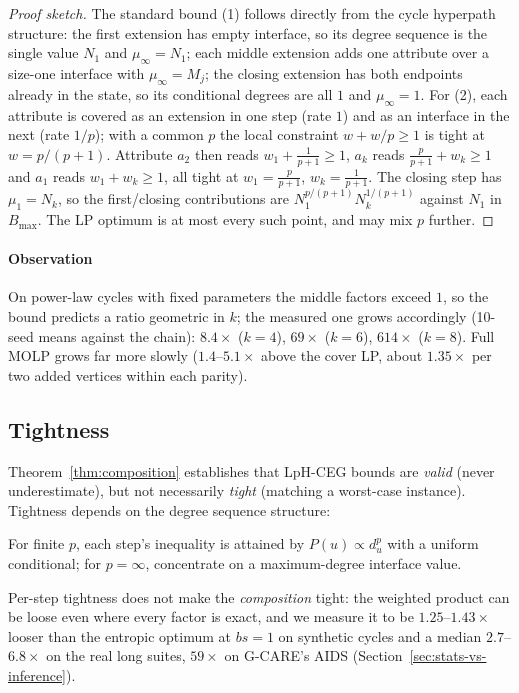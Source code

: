 \documentclass[conference]{IEEEtran}
\begin{document}
\begin{proof}[Proof sketch]
The standard bound (1) follows directly from the cycle hyperpath
structure: the first extension has empty interface, so its degree
sequence is the single value $N_1$ and $\mu_\infty = N_1$; each middle
extension adds one attribute over a size-one interface with
$\mu_\infty = M_j$; the closing extension has both endpoints already in
the state, so its conditional degrees are all $1$ and $\mu_\infty = 1$.
For (2), each attribute is covered as an extension in one step (rate
$1$) and as an interface in the next (rate $1/p$); with a common $p$ the
local constraint $w + w/p \ge 1$ is tight at $w = p/(p+1)$. Attribute
$a_2$ then reads $w_1 + \frac{1}{p+1} \ge 1$, $a_k$ reads
$\frac{p}{p+1} + w_k \ge 1$ and $a_1$ reads $w_1 + w_k \ge 1$, all tight
at $w_1 = \frac{p}{p+1}$, $w_k = \frac{1}{p+1}$. The closing step has
$\mu_1 = N_k$, so the first/closing contributions are
$N_1^{p/(p+1)} N_k^{1/(p+1)}$ against $N_1$ in $B_{\max}$. The LP optimum
is at most every such point, and may mix $p$ further.
\end{proof}

\paragraph{Observation} On power-law cycles with
fixed parameters the middle factors exceed $1$, so the bound predicts a
ratio geometric in $k$; the measured one grows accordingly (10-seed means against the chain): $8.4\times$ ($k{=}4$), $69\times$
($k{=}6$), $614\times$ ($k{=}8$). Full MOLP grows far more slowly ($1.4$--$5.1\times$ above the cover LP, about $1.35\times$ per two added vertices within each parity).

\subsection{Tightness}

Theorem~\ref{thm:composition} establishes that LpH-CEG bounds are
\emph{valid} (never underestimate), but not necessarily \emph{tight}
(matching a worst-case instance).
Tightness depends on the degree sequence structure:

For finite $p$, each step's inequality is attained by $P(u)\propto d_u^p$ with a uniform conditional; for $p=\infty$, concentrate on a maximum-degree interface value.

Per-step tightness does not make the \emph{composition} tight: the
weighted product can be loose even where every factor is exact, and we
measure it to be $1.25$--$1.43\times$ looser than the entropic optimum at
$bs{=}1$ on synthetic cycles and a median $2.7$--$6.8\times$ on the real long suites, $59\times$ on G-CARE's AIDS (Section~\ref{sec:stats-vs-inference}).
\end{document}
